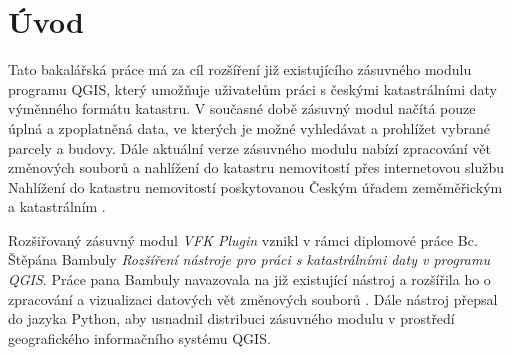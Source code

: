 \chapter{Úvod}
\label{1-uvod}
Tato bakalářská práce má za cíl rozšíření již existujícího zásuvného modulu programu QGIS, který umožňuje uživatelům práci s českými katastrálními daty výměnného formátu katastru. V současné době zásuvný modul načítá pouze úplná a zpoplatněná data, ve kterých je možné vyhledávat a prohlížet vybrané parcely a budovy. Dále aktuální verze zásuvného modulu nabízí zpracování vět změnových souborů a nahlížení do katastru nemovitostí přes internetovou službu Nahlížení do katastru nemovitostí poskytovanou Českým úřadem zeměměřickým a katastrálním .




Rozšiřovaný zásuvný modul \textit{VFK Plugin} vznikl v rámci diplomové práce Bc. Štěpána Bambuly \textit{Rozšíření nástroje pro práci s katastrálními daty v programu QGIS}.  Práce pana Bambuly navazovala na již existující nástroj a rozšířila ho o zpracování a vizualizaci datových vět změnových souborů . Dále nástroj přepsal do jazyka Python, aby usnadnil distribuci zásuvného modulu v prostředí geografického informačního systému QGIS.

